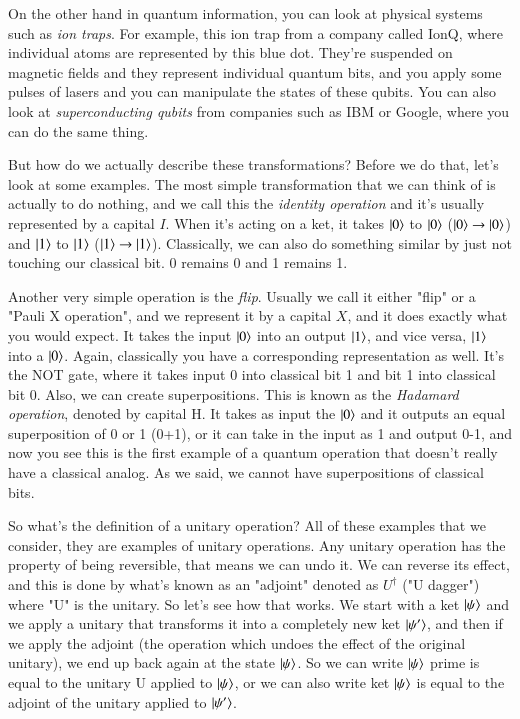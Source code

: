 On the other hand in quantum information, you can look at physical systems such as \emph{ion traps}. For example, this ion trap from a company called IonQ, where individual atoms are represented by this blue dot. They're suspended on magnetic fields and they represent individual quantum bits, and you apply some pulses of lasers and you can manipulate the states of these qubits.  You can also look at \emph{superconducting qubits} from companies such as IBM or Google, where you can do the same thing. 

But how do we actually describe these transformations? Before we do that, let's look at some examples. The most simple transformation that we can think of is actually to do nothing, and we call this the \emph{identity operation} and it's usually represented by a capital $I$. When it's acting on a ket, it takes $\left| 0 \right\rangle$ to  $\left| 0 \right\rangle$  ($\left| 0 \right\rangle\rightarrow\left| 0 \right\rangle$) and $\left| 1 \right\rangle$ to $\left| 1 \right\rangle$ ($\left| 1 \right\rangle\rightarrow\left| 1 \right\rangle$). Classically, we can also do something similar by just not touching our classical bit. 0 remains 0 and 1 remains 1.

Another very simple operation is the \emph{flip}. Usually we call it either "flip" or a "Pauli X operation", and we represent it by a capital $X$, and it does exactly what you would expect. It takes the input $\left| 0 \right\rangle$ into an output $\left| 1 \right\rangle$, and vice versa, $\left| 1 \right\rangle$ into a $\left| 0 \right\rangle$. Again, classically you have a corresponding representation as well. It's the NOT gate, where it takes input 0 into classical bit 1 and bit 1 into classical bit 0. Also, we can create superpositions. This is known as the \emph{Hadamard operation}, denoted by capital H. It takes as input the $\left| 0 \right\rangle$ and it outputs an equal superposition of 0 or 1 (0+1), or it can take in the input as 1 and output 0-1, and now you see this is the first example of a quantum operation that doesn't really have a classical analog. As we said, we cannot have superpositions of classical bits.

So what's the definition of a unitary operation? All of these examples that we consider, they are examples of unitary operations. Any unitary operation has the property of being reversible, that means we can undo it. We can reverse its effect, and this is done by what's known as an "adjoint" denoted as $U^\dagger$ ("U dagger") where "U" is the unitary.
So let's see how that works. We start with a ket $\left| \psi \right\rangle$ and we apply a unitary that transforms it into a completely new ket $\left| \psi' \right\rangle$, and then if we apply the adjoint (the operation which undoes the effect of the original unitary), we end up back again at the state $\left| \psi \right\rangle$. So we can write $\left| \psi \right\rangle$ prime is equal to the unitary U applied to $\left| \psi \right\rangle$, or we can also write ket $\left| \psi \right\rangle$ is equal to the adjoint of the unitary applied to $\left| \psi' \right\rangle$. 

